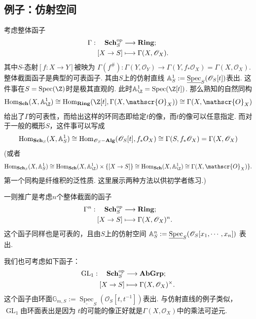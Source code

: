     \subsection{例子：仿射空间}
    考虑整体函子
    \begin{equation*}\begin{aligned}
        \Gamma: \quad \mathbf{Sch}_{S}^{\mathrm{op}} &\longrightarrow \mathbf{Ring} ; \\
        [X \to S] &\longmapsto \Gamma(X,\mathscr{O}_{X}). \\
    \end{aligned}\end{equation*}
    其中$S$-态射$[f:X \to Y]$被映为
    $\Gamma(f^{\#}):\Gamma(Y,\mathscr{O}_{Y}) 
    \to \Gamma(Y,f_{*}\mathscr{O}_{X}) = \Gamma(X,\mathscr{O}_{X})$.
    整体截面函子是典型的可表函子. 
    其由$S$上的仿射直线
    $\mathbb{A}_{S}^{1} := 
    \underline{\operatorname{Spec}}_{S}(\mathscr{O}_{S}[t])$表出. 
    这件事在$S = \spec(\Z)$时是极其直观的. 
    此时$\mathbb{A}_{\Z}^{1} = \spec(\Z[t])$.
    那么熟知的自然同构
    \[\hom_{\Sch}(X,\mathbb{A}_{\Z}^{1}) 
    \cong \hom_{\ring}(\Z[t],\Gamma(X,\mathscr{O}_{X})) 
    \cong \Gamma(X,\mathscr{O}_{X})\]
    给出了$\Gamma$的可表性，而给出这样的环同态即给定$t$的像，而$t$的像可以任意指定.
    而对于一般的概形$S$，这件事可以写成
    \[\operatorname{Hom}_{\mathbf{Sch}_{S}}(X,\mathbb{A}_{S}^{1}) 
    \cong \operatorname{Hom}_{\mathscr{O}_{S}-\mathbf{Alg}}(\mathscr{O}_{S}[t],f_{*}O_{X}) 
    \cong \Gamma(S,f_{*}\mathscr{O}_{X}) 
    = \Gamma(X,\mathscr{O}_{X})\]
    (或者\[\hom_{\sch{S}}(X,\mathbb{A}_{S}^{1}) 
    \cong \hom_{\Sch}(X,\mathbb{A}_{\Z}^{1}) \times \{[X \to S]\}
    \cong \hom_{\Sch}(X,\mathbb{A}_{\Z}^{1}) 
    \cong \Gamma(X,\mathscr{O}_{X})\}.\] 
    第一个同构是纤维积的泛性质. 这里展示两种方法以供初学者练习.)

    一则推广是考虑$n$个整体截面的函子
    \begin{equation*}\begin{aligned}
        \Gamma^{n}: \quad \mathbf{Sch}_{S}^{\mathrm{op}} &\longrightarrow \mathbf{Ring} ; \\
        [X \to S] &\longmapsto \Gamma(X,\mathscr{O}_{X})^{n}. \\
    \end{aligned}\end{equation*}
    这个函子同样也是可表的，且由$S$上的仿射空间
    $\mathbb{A}_{S}^{n} := 
    \underline{\operatorname{Spec}}_{S}(\mathscr{O}_{S}[x_{1},\cdots,x_{n}])$
    表出. 

    我们也可考虑如下函子：
    \begin{equation*}\begin{aligned}
        \operatorname{GL}_{1}: \quad \mathbf{Sch}_{S}^{\mathrm{op}} &\longrightarrow \mathbf{AbGrp} ; \\
        [X \to S] &\longmapsto \Gamma(X,\mathscr{O}_{X})^{\times}. \\
    \end{aligned}\end{equation*}
    这个函子由环面$\mathbb{G}_{m,S} := 
    \underline{\operatorname{Spec}}_{S}(\mathscr{O}_{S}[t,t^{-1}])$表出. 
    与仿射直线的例子类似，$\operatorname{GL}_{1}$由环面表出是因为
    $t$的可能的像正好就是$\Gamma(X,\mathscr{O}_{X})$中的乘法可逆元. 
    
